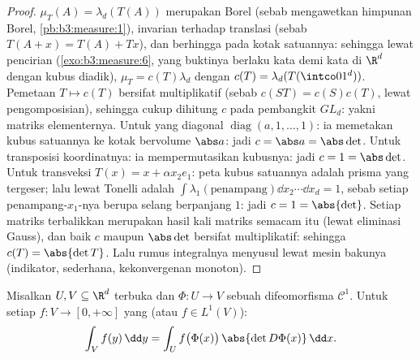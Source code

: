 \begin{proof}
 $\mu_T(A) = \lambda_d(T(A))$ merupakan  Borel
(sebab  mengawetkan himpunan Borel,
\cref{pb:b3:measure:1}), invarian terhadap translasi
(sebab $T(A + x) = T(A) + Tx$), dan berhingga pada kotak satuannya: sehingga lewat
pencirian 
(\cref{exo:b3:measure:6}, yang buktinya berlaku kata demi kata di
$\R^d$ dengan kubus diadik), $\mu_T = c(T)\lambda_d$ dengan $c(T)
= \lambda_d(T(\intco01^d))$. Pemetaan $T \mapsto c(T)$ bersifat
multiplikatif (sebab $c(ST) = c(S)c(T)$, lewat pengomposisian), sehingga
cukup dihitung $c$ pada pembangkit $GL_d$: yakni
matriks elementernya. Untuk yang diagonal $\operatorname{diag}(a, 1, \dots, 1)$:
ia memetakan kubus satuannya ke kotak bervolume $\abs a$: jadi $c = \abs a =
\abs\det$. Untuk transposisi koordinatnya: ia mempermutasikan kubusnya: jadi $c
= 1 = \abs\det$. Untuk transveksi $T(x) = x + \alpha
x_2e_1$: peta kubus satuannya adalah prisma yang tergeser; lalu lewat
Tonelli  adalah $\int\lambda_1(\text{penampang})\dd x_2
\cdots \dd x_d = 1$, sebab setiap penampang-$x_1$-nya berupa selang
berpanjang $1$: jadi $c = 1 = \abs{\det}$. Setiap matriks terbalikkan merupakan
hasil kali matriks semacam itu (lewat eliminasi Gauss), dan baik $c$ maupun
$\abs\det$ bersifat multiplikatif: sehingga $c(T) = \abs{\det T}$. Lalu
rumus integralnya menyusul lewat mesin bakunya (indikator,
sederhana, kekonvergenan monoton).
\end{proof}

\begin{theorem}\label{thm:b3:product:changeofvar}
Misalkan $U, V \subseteq \R^d$ terbuka dan $\Phi \colon U \to V$ sebuah
difeomorfisma $\mathcal C^1$. Untuk setiap $f \colon V
\to [0, +\infty]$ yang  (atau $f \in L^1(V)$):
\[
\int_V f(y)\,\dd y = \int_U
f\bigl(\Phi(x)\bigr)\,\abs{\det D\Phi(x)}\,\dd x .
\]
\end{theorem}


